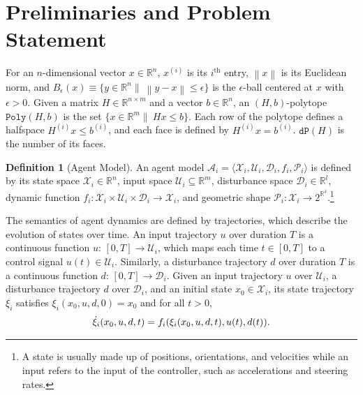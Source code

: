 \documentclass[letterpaper]{article} %
\theoremstyle{definition}
\newtheorem{definition}{Definition}
\newcommand{\norm}[1]{\left\lVert#1\right\rVert}
\begin{document}
\section{Preliminaries and Problem Statement}\label{section:formulation}

For an $n$-dimensional vector $x \in \mathbb{R}^n$, $x^{(i)}$ is its $i^\text{th}$ entry, $\norm{x}$ is its Euclidean norm, and $B_\epsilon(x) \equiv \{y \in \mathbb{R}^n \|\ \norm{y-x} \leq \epsilon\}$ is the $\epsilon$-ball centered at $x$ with $\epsilon>0$. Given a matrix $H \in \mathbb{R}^{n \times m}$ and a vector $b \in \mathbb{R}^n$, an $(H,b)$-polytope $\texttt{Poly}(H, b)$ is the set $\{x \in \mathbb{R}^m \|\ Hx \leq b\}$. Each row of the polytope defines a halfspace $H^{(i)}x \leq b^{(i)}$, and each face is defined by $H^{(i)}x = b^{(i)}$. $\texttt{dP}(H)$ is the number of its faces.

\begin{definition}[Agent Model]
An agent model $\mathcal{A}_i = \langle  \mathcal{X}_i, \mathcal{U}_i, \mathcal{D}_i, f_i, \mathcal{P}_i\rangle$ is defined by its state space $\mathcal{X}_i \in \mathbb{R}^n$, input space $\mathcal{U}_i \subseteq \mathbb{R}^m$, disturbance space $\mathcal{D}_i \in \mathbb{R}^{l}$, dynamic function $f_i: \mathcal{X}_i \times \mathcal{U}_i \times \mathcal{D}_i \rightarrow \mathcal{X}_i$, and geometric shape $\mathcal{P}_i: \mathcal{X}_i \rightarrow 2^{\mathbb{R}^\delta}$.\footnote{A state is usually made up of positions, orientations, and velocities while an input refers to the input of the controller, such as accelerations and steering rates.}
\end{definition}

The semantics of agent dynamics are defined by trajectories, which describe the evolution of states over time. An input trajectory $u$ over duration $T$ is a continuous function $u$: $[0, T] \rightarrow \mathcal{U}_i$, which maps each time $t \in [0, T]$ to a control signal $u(t) \in \mathcal{U}_i$. Similarly, a disturbance trajectory $d$ over duration $T$ is a continuous function $d$: $[0, T] \rightarrow \mathcal{D}_i$. Given an input trajectory $u$ over $\mathcal{U}_i$, a disturbance trajectory $d$ over $\mathcal{D}_i$, and an initial state $x_{0} \in \mathcal{X}_i$, its state trajectory $\xi_i$ satisfies $\xi_i(x_0, u, d, 0) = x_{0}$ and for all $t > 0$,
\[\small
    \dot \xi_i (x_0, u, d, t) = f_i(\xi_i(x_0, u, d, t), u(t), d(t)).
\]
\end{document}
